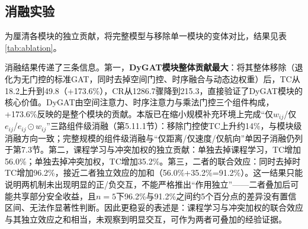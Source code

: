 \documentclass[12pt,a4paper,UTF8]{ctexart}
\begin{document}
\subsection{消融实验}

为厘清各模块的独立贡献，将完整模型与移除单一模块的变体对比，结果见表\ref{tab:ablation}。

\begin{table}[H]
    \centering
    \caption{消融实验（$n=5$）}
    \label{tab:ablation}
\end{table}

消融结果传递了三条信息。第一，\textbf{DyGAT模块整体贡献最大}：将其整体移除（退化为无门控的标准GAT，同时去掉空间门控、时序融合与动态边权重）后，TC从18.2上升到49.8（+173.6\%），CR从1286.7骤降到215.3，直接验证了DyGAT模块的核心价值。DyGAT由空间注意力、时序注意力与乘法门控三个组件构成，+173.6\%反映的是整个模块的贡献。本版已在缩小规模补充环境上完成“仅$w_{ij}$/仅$e_{ij}$/$e_{ij}\odot w_{ij}$”三路组件级消融（第5.11.1节）：移除门控使TC上升约14\%，与模块级消融方向一致；完整规模的组件级消融与“仅距离/仅速度/仅航向”单因子消融仍列于第7.3节。第二，课程学习与冲突加权的独立贡献：单独去掉课程学习，TC增加56.0\%；单独去掉冲突加权，TC增加35.2\%。第三，二者的联合效应：同时去掉时TC增加96.2\%，接近二者独立效应的加和（56.0\%+35.2\%=91.2\%）。这一结果只能说明两机制未出现明显的正/负交互，不能严格推出“作用独立”——二者叠加后可能共享部分安全收益，且$n=5$下96.2\%与91.2\%之间约5个百分点的差异没有置信区间、无法作显著性判断。因此更稳妥的表述是：课程学习与冲突加权的联合效应与其独立效应之和相当，未观察到明显交互，可作为两者可叠加的经验证据。
\end{document}

